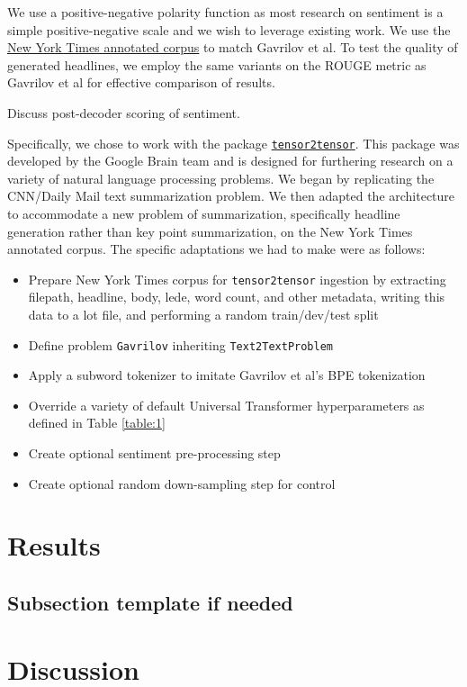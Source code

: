 \documentclass[11pt]{article}
\begin{document}
We use a positive-negative polarity function as most research on sentiment is a simple positive-negative scale and we wish to leverage existing work. We use the \href{https://catalog.ldc.upenn.edu/LDC2008T19}{New York Times annotated corpus} to match Gavrilov et al. 
To test the quality of generated headlines, we employ the same variants on the ROUGE metric as Gavrilov et al for effective comparison of results.

Discuss post-decoder scoring of sentiment.

Specifically, we chose to work with the package \href{https://github.com/tensorflow/tensor2tensor}{\texttt{tensor2tensor}}. This package was developed by the Google Brain team and is designed for furthering research on a variety of natural language processing problems. We began by replicating the CNN/Daily Mail text summarization problem. We then adapted the architecture to accommodate a new problem of summarization, specifically headline generation rather than key point summarization, on the New York Times annotated corpus. The specific adaptations we had to make were as follows:

\begin{itemize}
    \item Prepare New York Times corpus for \texttt{tensor2tensor} ingestion by extracting filepath, headline, body, lede, word count, and other metadata, writing this data to a lot file, and performing a random train/dev/test split
    \item Define problem \texttt{Gavrilov} inheriting \texttt{Text2TextProblem}
    \item Apply a subword tokenizer to imitate Gavrilov et al's BPE tokenization
    \item Override a variety of default Universal Transformer hyperparameters as defined in Table \ref{table:1}
    \item Create optional sentiment pre-processing step
    \item Create optional random down-sampling step for control
\end{itemize}

\section{Results}
\subsection{Subsection template if needed}
\section{Discussion}
\end{document}
